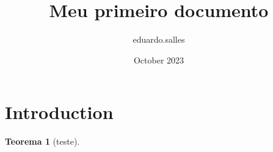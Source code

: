 \documentclass{article}
\title{Meu primeiro documento}
\author{eduardo.salles}
\date{October 2023}
\newtheorem{theorem}{Teorema}[section]
\begin{document}
\maketitle

\section{Introduction}

\begin{theorem}[teste]
    \lipsum[1]
\end{theorem}

\newpage
\end{document}
